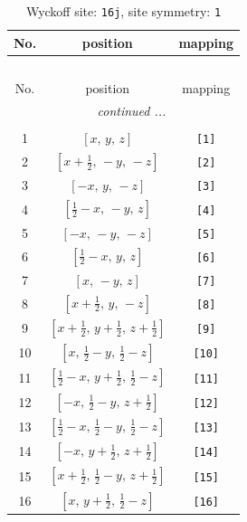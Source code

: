 \documentclass[fleqn,8pt]{jsarticle}
\begin{document}
\begin{longtable}{ccc}
\caption{Wyckoff site: {\tt 16j}, site symmetry: {\tt 1}}
 \\
 \hline \hline
No. & position & mapping \\ \hline \endfirsthead

\multicolumn{2}{l}{\tablename\ \thetable{}} \\
 \hline \hline
No. & position & mapping \\ \hline \endhead

 \hline \hline
\multicolumn{2}{r}{\footnotesize\it continued ...} \\ \endfoot

 \hline \hline
\multicolumn{2}{r}{} \\ \endlastfoot

1 & $\left[ x,\, y,\, z \right]$ & {\tt [1]} \\ \hline
2 & $\left[ x + \frac{1}{2},\, - y,\, - z \right]$ & {\tt [2]} \\ \hline
3 & $\left[ - x,\, y,\, - z \right]$ & {\tt [3]} \\ \hline
4 & $\left[ \frac{1}{2} - x,\, - y,\, z \right]$ & {\tt [4]} \\ \hline
5 & $\left[ - x,\, - y,\, - z \right]$ & {\tt [5]} \\ \hline
6 & $\left[ \frac{1}{2} - x,\, y,\, z \right]$ & {\tt [6]} \\ \hline
7 & $\left[ x,\, - y,\, z \right]$ & {\tt [7]} \\ \hline
8 & $\left[ x + \frac{1}{2},\, y,\, - z \right]$ & {\tt [8]} \\ \hline
9 & $\left[ x + \frac{1}{2},\, y + \frac{1}{2},\, z + \frac{1}{2} \right]$ & {\tt [9]} \\ \hline
10 & $\left[ x,\, \frac{1}{2} - y,\, \frac{1}{2} - z \right]$ & {\tt [10]} \\ \hline
11 & $\left[ \frac{1}{2} - x,\, y + \frac{1}{2},\, \frac{1}{2} - z \right]$ & {\tt [11]} \\ \hline
12 & $\left[ - x,\, \frac{1}{2} - y,\, z + \frac{1}{2} \right]$ & {\tt [12]} \\ \hline
13 & $\left[ \frac{1}{2} - x,\, \frac{1}{2} - y,\, \frac{1}{2} - z \right]$ & {\tt [13]} \\ \hline
14 & $\left[ - x,\, y + \frac{1}{2},\, z + \frac{1}{2} \right]$ & {\tt [14]} \\ \hline
15 & $\left[ x + \frac{1}{2},\, \frac{1}{2} - y,\, z + \frac{1}{2} \right]$ & {\tt [15]} \\ \hline
16 & $\left[ x,\, y + \frac{1}{2},\, \frac{1}{2} - z \right]$ & {\tt [16]} \\
\end{longtable}
\end{document}
